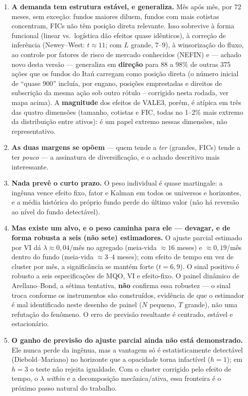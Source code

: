 \documentclass[11pt,a4paper]{article}
\begin{document}
\begin{enumerate}[topsep=2pt,itemsep=2pt]
\item \textbf{A demanda tem estrutura estável, e generaliza.} Mês após mês, por 72 meses, sem
exceção: fundos maiores diluem, fundos com mais cotistas concentram, FICs não têm posição direta
relevante. Isso sobrevive à forma funcional (linear vs.\ logística dão efeitos quase idênticos),
à correção de inferência (Newey--West: $t\approx11$; com $L$ grande, $7$--$9$), à winsorização do
fluxo, ao controle por fatores de risco de mercado conhecidos (NEFIN) e --- achado novo desta
versão --- generaliza em \textbf{direção} para 88 a 98\% de outras 375 ações que os fundos
do Itaú carregam como posição direta (o número inicial de ``quase 900'' incluía, por engano,
posições emprestadas e direitos de subscrição da mesma ação sob outro rótulo -- corrigido nesta
rodada, ver mapa acima). A \textbf{magnitude} dos efeitos de VALE3, porém, é atípica em três das
quatro dimensões (tamanho, cotistas e FIC, todas no 1--2\% mais extremo da distribuição entre
ativos): é um papel extremo nessas dimensões, não representativo.
\item \textbf{As duas margens se opõem} --- quem tende a \emph{ter} (grandes, FICs) tende a ter
\emph{pouco} --- a assinatura de diversificação, e o achado descritivo mais interessante.
\item \textbf{Nada prevê o curto prazo.} O peso individual é quase martingale: a ingênua vence
efeito fixo, fator e Kalman em todos os universos e horizontes, e a média histórica do próprio
fundo perde do último valor (não há reversão ao nível do fundo detectável).
\item \textbf{Mas existe um alvo, e o peso caminha para ele --- devagar, e de forma robusta a
seis (não sete) estimadores.} O ajuste parcial estimado por VI dá $\lambda\approx0{,}04$/mês no
agregado (meia-vida $\approx16$ meses) e $\approx0{,}19$/mês dentro do fundo (meia-vida
$\approx3$--$4$ meses); com efeito de tempo em vez de cluster por mês, a significância se
mantém forte ($t=6{,}9$). O sinal positivo é robusto a seis especificações de MQO, VI e
efeito-fixo. O painel dinâmico de Arellano--Bond, a sétima tentativa, \textbf{não} confirma essa
robustez --- o sinal troca conforme os instrumentos são construídos, evidência de que o estimador
é mal identificado neste desenho de painel ($N$ pequeno, $T$ grande), não uma refutação do
fenômeno. O erro de previsão resultante é centrado, estável e estacionário.
\item \textbf{O ganho de previsão do ajuste parcial ainda não está demonstrado.} Ele nunca perde
da ingênua, mas a vantagem só é estatisticamente detectável (Diebold--Mariano) no horizonte que a
opacidade torna infactível ($h=1$); em $h=3$ o teste não rejeita igualdade. Com o cluster
corrigido pelo efeito de tempo, o $\lambda$ \emph{within} e a decomposição mecânica/ativa, essa
fronteira é o próximo passo natural do trabalho.
\end{enumerate}
\end{document}
